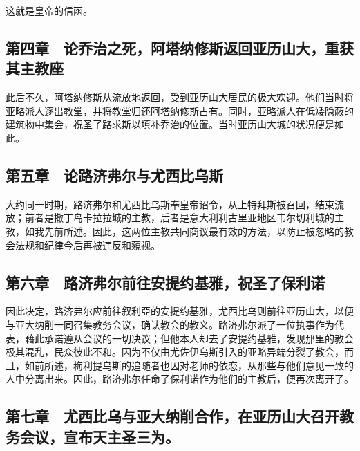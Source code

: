 这就是皇帝的信函。\par


\subsection{第四章　论乔治之死，阿塔纳修斯返回亚历山大，重获其主教座}

此后不久，阿塔纳修斯从流放地返回，受到亚历山大居民的极大欢迎。他们当时将亚略派人逐出教堂，并将教堂归还阿塔纳修斯占有。同时，亚略派人在低矮隐蔽的建筑物中集会，祝圣了路求斯以填补乔治的位置。当时亚历山大城的状况便是如此。\par


\subsection{第五章　论路济弗尔与尤西比乌斯}

大约同一时期，路济弗尔和尤西比乌斯奉皇帝诏令，从上特拜斯被召回，结束流放；前者是撒丁岛卡拉拉城的主教，后者是意大利利古里亚地区韦尔切利城的主教，如我先前所述。因此，这两位主教共同商议最有效的方法，以防止被忽略的教会法规和纪律今后再被违反和藐视。\par


\subsection{第六章　路济弗尔前往安提约基雅，祝圣了保利诺}

因此决定，路济弗尔应前往叙利亞的安提约基雅，尤西比乌则前往亚历山大，以便与亚大纳削一同召集教务会议，确认教会的教义。路济弗尔派了一位执事作为代表，藉此承诺遵从会议的一切决议；但他本人却去了安提约基雅，发现那里的教会极其混乱，民众彼此不和。因为不仅由尤佐伊乌斯引入的亚略异端分裂了教会，而且，如前所述，梅利提乌斯的追随者也因对老师的依恋，从那些与他们意见一致的人中分离出来。因此，路济弗尔任命了保利诺作为他们的主教后，便再次离开了。\par


\subsection{第七章　尤西比乌与亚大纳削合作，在亚历山大召开教务会议，宣布天主圣三为。}

